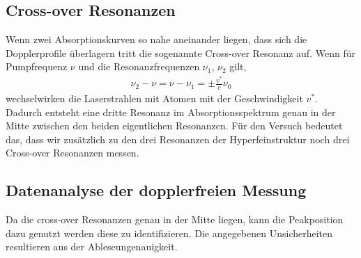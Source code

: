 \documentclass[../bericht.tex]{subfiles}
\begin{document}
      \subsection{Cross-over Resonanzen}
      \label{subsec:cross-over-resonanzen}

        Wenn zwei Absorptionskurven so nahe aneinander liegen, dass sich die Dopplerprofile \"uberlagern tritt die sogenannte Cross-over Resonanz auf. Wenn für Pumpfrequenz $\nu$ und die Resonanzfrequenzen $\nu_1$, $\nu_2$ gilt,
        \begin{align}
        \nu_2 - \nu = \nu - \nu_1 = \pm \frac{v^*}{c} \nu_0
        \end{align}
        wechselwirken die Laserstrahlen mit Atomen mit der Geschwindigkeit $v^*$. Dadurch entsteht eine dritte Resonanz im Absorptionsspektrum genau in der Mitte zwischen den beiden eigentlichen Resonanzen. F\"ur den Versuch bedeutet das, dass wir zus\"atzlich zu den drei Resonanzen der Hyperfeinstruktur noch drei Cross-over Resonanzen messen.

      \subsection{Datenanalyse der dopplerfreien Messung}

        Da die cross-over Resonanzen genau in der Mitte liegen, kann die Peakposition dazu genutzt werden diese zu identifizieren. Die angegebenen Unsicherheiten resultieren aus der Ableseungenauigkeit.  \\
\end{document}
